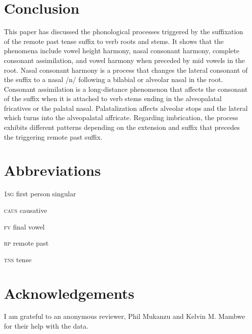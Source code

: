 \documentclass[output=paper]{langsci/langscibook}
\begin{document}
\section{Conclusion} \label{§5:conclusion.kawasha}

This paper has discussed the phonological processes triggered by the suffixation of the remote past tense suffix to verb roots and stems. It shows that the phenomena include vowel height harmony, nasal consonant harmony, complete consonant assimilation, and vowel harmony when preceded by mid vowels in the root. Nasal consonant harmony is a process that changes the lateral consonant of the suffix to a nasal /n/ following a bilabial or alveolar nasal in the root. Consonant assimilation is a long-distance phenomenon that affects the consonant of the suffix when it is attached to verb stems ending in the alveopalatal fricatives or the palatal nasal. Palatalization affects alveolar stops and the lateral which turns into the alveopalatal affricate. Regarding imbrication, the process exhibits different patterns depending on the extension and suffix that precedes the triggering remote past suffix. 



\section*{Abbreviations}


\textsc{1sg}  first person singular

\textsc{caus}  causative 

\textsc{fv}  final vowel

\textsc{rp}  remote past

\textsc{tns}  tense




\section*{Acknowledgements}

I am grateful to an anonymous reviewer, Phil Mukanzu and Kelvin M. Mambwe for their help with the data. 



{\sloppy
\printbibliography[heading=subbibliography,notkeyword=this]
}
\end{document}
